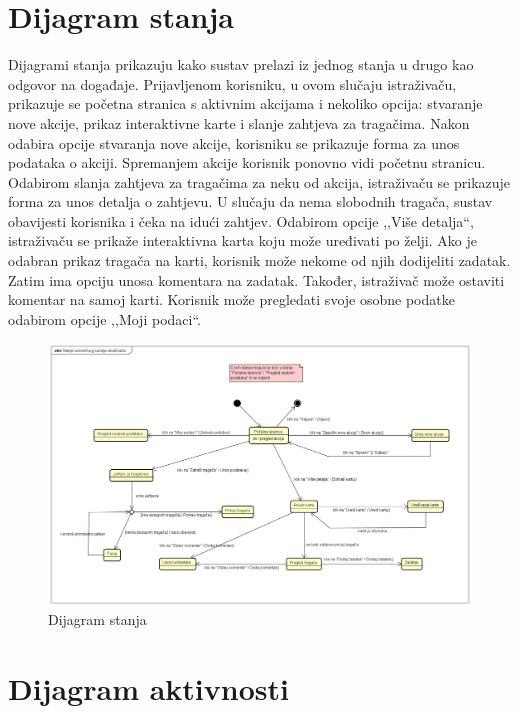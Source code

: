 			
			\eject
		
		\section{Dijagram stanja}
			
			
			Dijagrami stanja prikazuju kako sustav prelazi iz jednog stanja u drugo kao odgovor na događaje. Prijavljenom korisniku, u ovom slučaju istraživaču, prikazuje se početna stranica s aktivnim akcijama i nekoliko opcija: stvaranje nove akcije, prikaz interaktivne karte i slanje zahtjeva za tragačima. Nakon odabira opcije stvaranja nove akcije, korisniku se prikazuje forma za unos podataka o akciji. Spremanjem akcije korisnik ponovno vidi početnu stranicu. Odabirom slanja zahtjeva za tragačima za neku od akcija, istraživaču se prikazuje forma za unos detalja o zahtjevu. U slučaju da nema slobodnih tragača, sustav obavijesti korisnika i čeka na idući zahtjev. Odabirom opcije ,,Više detalja“, istraživaču se prikaže interaktivna karta koju može uređivati po želji. Ako je odabran prikaz tragača na karti, korisnik može nekome od njih dodijeliti zadatak. Zatim ima opciju unosa komentara na zadatak. Također, istraživač može ostaviti komentar na samoj karti. Korisnik može pregledati svoje osobne podatke odabirom opcije ,,Moji podaci“.
			
			\begin{figure}[H]
				\includegraphics[scale=0.3]{dijagrami/DijStanja.png} 
				\centering
				\caption{Dijagram stanja}
				\label{fig:promjene}
			\end{figure}
			
			
			\eject 
		
		\section{Dijagram aktivnosti}
			
